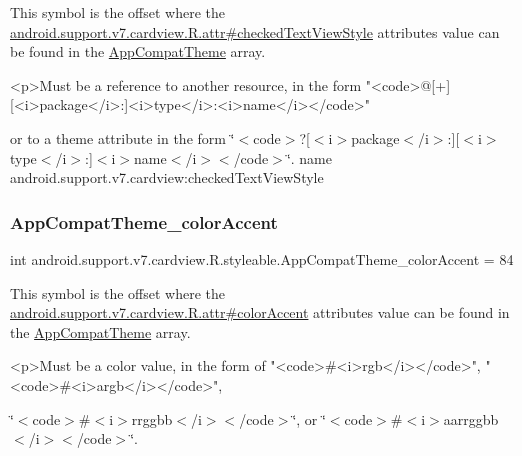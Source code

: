 This symbol is the offset where the \hyperlink{classandroid_1_1support_1_1v7_1_1cardview_1_1R_1_1attr_a217d182107bfc99ee474dcddb89ab962}{android.\+support.\+v7.\+cardview.\+R.\+attr\#checked\+Text\+View\+Style} attribute\textquotesingle{}s value can be found in the \hyperlink{classandroid_1_1support_1_1v7_1_1cardview_1_1R_1_1styleable_a52e6f69f954ecc2622d72c0b4d298938}{App\+Compat\+Theme} array.

\begin{DoxyVerb}      <p>Must be a reference to another resource, in the form "<code>@[+][<i>package</i>:]<i>type</i>:<i>name</i></code>"
\end{DoxyVerb}
 or to a theme attribute in the form \char`\"{}$<$code$>$?\mbox{[}$<$i$>$package$<$/i$>$\+:\mbox{]}\mbox{[}$<$i$>$type$<$/i$>$\+:\mbox{]}$<$i$>$name$<$/i$>$$<$/code$>$\char`\"{}.  name android.\+support.\+v7.\+cardview\+:checked\+Text\+View\+Style \mbox{\label{classandroid_1_1support_1_1v7_1_1cardview_1_1R_1_1styleable_a8b1986b83a7cb120ab848ae271cb90c8}} 
\subsubsection{\texorpdfstring{App\+Compat\+Theme\+\_\+color\+Accent}{AppCompatTheme\_colorAccent}}
{\footnotesize\ttfamily int android.\+support.\+v7.\+cardview.\+R.\+styleable.\+App\+Compat\+Theme\+\_\+color\+Accent = 84\hspace{0.3cm}{\ttfamily [static]}}

This symbol is the offset where the \hyperlink{classandroid_1_1support_1_1v7_1_1cardview_1_1R_1_1attr_ae4b67ff4722615a50ba854b46c49d044}{android.\+support.\+v7.\+cardview.\+R.\+attr\#color\+Accent} attribute\textquotesingle{}s value can be found in the \hyperlink{classandroid_1_1support_1_1v7_1_1cardview_1_1R_1_1styleable_a52e6f69f954ecc2622d72c0b4d298938}{App\+Compat\+Theme} array.

\begin{DoxyVerb}      <p>Must be a color value, in the form of "<code>#<i>rgb</i></code>", "<code>#<i>argb</i></code>",
\end{DoxyVerb}
 \char`\"{}$<$code$>$\#$<$i$>$rrggbb$<$/i$>$$<$/code$>$\char`\"{}, or \char`\"{}$<$code$>$\#$<$i$>$aarrggbb$<$/i$>$$<$/code$>$\char`\"{}. 

